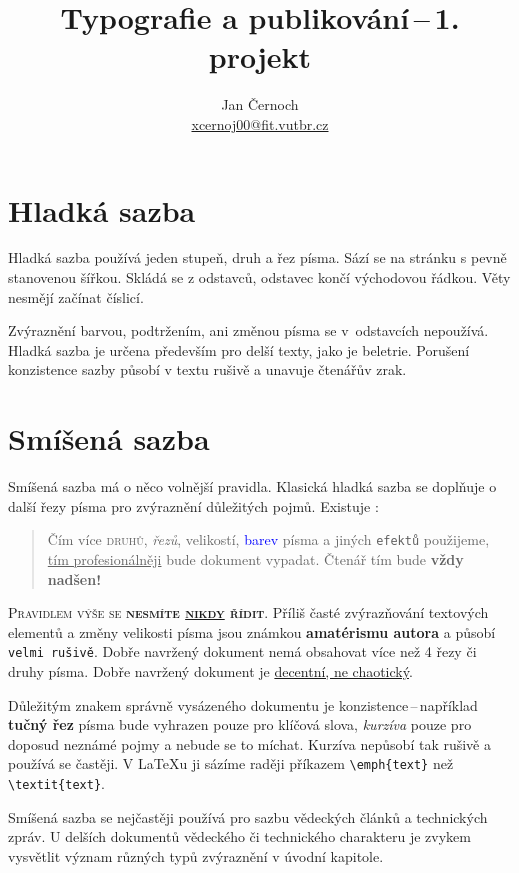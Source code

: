 \documentclass[10pt,twocolumn]{article}
\title{Typografie a publikování\,--\,1. projekt}
\author{Jan Černoch \\ \href{mailto:xcernoj00@fit.vutbr.cz}{xcernoj00@fit.vutbr.cz}}
\date{}
\begin{document}
\maketitle

\section{Hladká sazba} \label{1}
Hladká sazba používá jeden stupeň, druh a řez písma.
Sází se na stránku s pevně stanovenou šířkou.
Skládá se z odstavců, odstavec končí východovou řádkou.
Věty nesmějí začínat číslicí.

Zvýraznění barvou, podtržením, ani změnou písma se v~odstavcích nepoužívá.
Hladká sazba je určena především pro delší texty, jako je beletrie.
Porušení konzistence sazby působí v textu rušivě a unavuje čtenářův zrak.

\section{Smíšená sazba} \label{2}
Smíšená sazba má o něco volnější pravidla.
Klasická hladká sazba se doplňuje o další řezy písma pro zvýraznění důležitých pojmů.
Existuje :
\begin{quotation}
    Čím více \textsc{druhů}, \textit{řezů}, {\LARGE velikostí}, \textcolor{blue}{barev} písma a jiných \texttt{efektů} použijeme, \underline{tím profesionálněji} bude {\selectfont dokument} vypadat. Čtenář tím bude \textbf{\tiny{vždy nadšen!}}
\end{quotation}

\textsc{Pravidlem výše se \textbf{nesmíte \underline{nikdy} řídit}}.
Příliš časté zvýrazňování textových elementů a změny {\tiny velikosti} písma jsou známkou \textbf{amatérismu autora} a působí \texttt{velmi rušivě}.
Dobře navržený dokument nemá obsahovat více než 4 řezy či druhy písma.
Dobře navržený dokument je \underline{decentní, ne chaotický}.

Důležitým znakem správně vysázeného dokumentu je konzistence\,--\,například \textbf{tučný řez} písma bude vyhrazen pouze pro klíčová slova, {\itshape kurzíva} pouze pro doposud neznámé pojmy a nebude se to míchat.
Kurzíva nepůsobí tak rušivě a používá se častěji.
V \LaTeX u ji sázíme raději příkazem \texttt{\textbackslash emph\{text\}} než \texttt{\textbackslash textit\{text\}}.

Smíšená sazba se nejčastěji používá pro sazbu vědeckých článků a technických zpráv.
U delších dokumentů vědeckého či technického charakteru je zvykem vysvětlit význam různých typů zvýraznění v úvodní kapitole.
\end{document}
